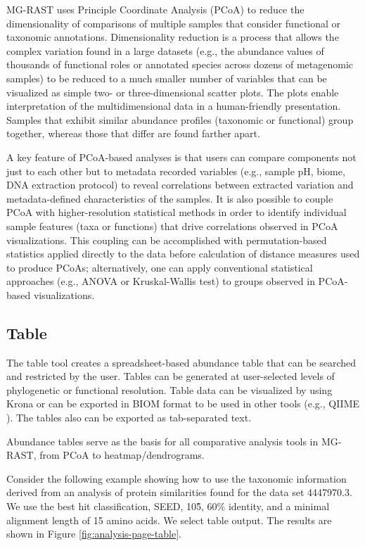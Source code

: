 \documentclass[12pt,fullpage]{report}
\begin{document}
MG-RAST uses Principle Coordinate Analysis (PCoA) to reduce the dimensionality of comparisons of multiple samples that consider functional or taxonomic annotations.
Dimensionality reduction is a process that allows the complex variation found in a large datasets (e.g., the abundance values of thousands of functional roles or annotated species across dozens of metagenomic samples) to be reduced to a much smaller number of variables that can be visualized as simple two- or three-dimensional scatter plots. The plots enable interpretation of the multidimensional data in a human-friendly presentation. Samples that exhibit similar abundance profiles (taxonomic or functional) group together, whereas those that differ are found farther apart.

A key feature of PCoA-based analyses is that users can compare components not just to each other but to metadata recorded variables (e.g., sample pH, biome, DNA extraction protocol) to reveal correlations between extracted variation and metadata-defined characteristics of the samples. It is also possible to couple PCoA with higher-resolution statistical methods in order to identify individual sample features (taxa or functions) that drive correlations observed in PCoA visualizations. This coupling can be accomplished with permutation-based statistics applied directly to the data before calculation of distance measures used to produce PCoAs; alternatively, one can apply conventional statistical approaches (e.g., ANOVA or Kruskal-Wallis test) to groups observed in PCoA-based visualizations.
\subsection{Table}

The table tool creates a spreadsheet-based abundance table that can be searched and restricted by the user. Tables can be generated at user-selected levels of phylogenetic or functional resolution. Table data can be visualized by using Krona \cite{KRONA} or  can be exported in BIOM\cite{BIOM} format to be used in other tools (e.g., QIIME \cite{QIIME}).  The tables also can be exported as tab-separated text.

Abundance tables serve as the basis for all comparative analysis tools in MG-RAST, from PCoA to heatmap/dendrograms.

Consider the following example showing how to use
the taxonomic information derived from an analysis of protein similarities found for the data set 4447970.3.
We use the best hit classification, \gls{SEED}, 10\^5, 60\% identity, and a minimal alignment length of 15 amino acids. We select table output. The results are shown in Figure \ref{fig:analysis-page-table}.
\end{document}
